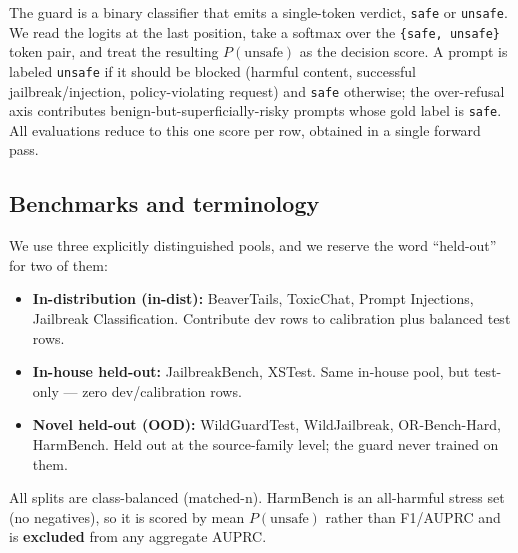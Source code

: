 \documentclass[sigconf,nonacm]{acmart}
\begin{document}
The guard is a binary classifier that emits a single-token verdict, \texttt{safe} or \texttt{unsafe}. We read the logits at the last position, take a softmax over the \texttt{\{safe, unsafe\}} token pair, and treat the resulting $P(\text{unsafe})$ as the decision score. A prompt is labeled \texttt{unsafe} if it should be blocked (harmful content, successful jailbreak/injection, policy-violating request) and \texttt{safe} otherwise; the over-refusal axis contributes benign-but-superficially-risky prompts whose gold label is \texttt{safe}. All evaluations reduce to this one score per row, obtained in a single forward pass.

\subsection{Benchmarks and terminology}

We use three explicitly distinguished pools, and we reserve the word ``held-out'' for two of them:

\begin{itemize}
  \item \textbf{In-distribution (in-dist):} BeaverTails, ToxicChat, Prompt Injections, Jailbreak Classification. Contribute dev rows to calibration plus balanced test rows.
  \item \textbf{In-house held-out:} JailbreakBench, XSTest. Same in-house pool, but test-only --- zero dev/calibration rows.
  \item \textbf{Novel held-out (OOD):} WildGuardTest, WildJailbreak, OR-Bench-Hard, HarmBench. Held out at the source-family level; the guard never trained on them.
\end{itemize}

All splits are class-balanced (matched-n). HarmBench is an all-harmful stress set (no negatives), so it is scored by mean $P(\text{unsafe})$ rather than F1/AUPRC and is \textbf{excluded} from any aggregate AUPRC.
\end{document}
